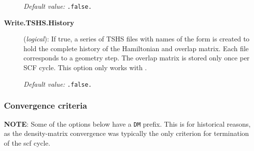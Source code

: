 \begin{description}
\textit{Default value:} \texttt{.false.}

\item[\textbf{Write.TSHS.History}] (\textit{logical}):
%
%
%
If true, a series of TSHS files with names of the form
 is created to hold the complete history of the
Hamiltonian and overlap matrix. Each file corresponds to a geometry
step. The overlap matrix is stored only once per SCF cycle. This
option only works with \tsiesta.

\textit{Default value:} \texttt{.false.}

\end{description}


\subsubsection{Convergence criteria}

\textbf{NOTE}: Some of the options below have a \texttt{DM} prefix. This is
for historical reasons, as the density-matrix convergence was
typically the only criterion for termination of the scf cycle.

